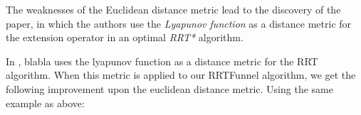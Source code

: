 The weaknesses of the Euclidean distance metric lead to the discovery of the
\cite{parkFeedbackMotionPlanning2015} paper, in which the authors use the
\textit{Lyapunov function} as a distance metric for the extension operator in an
optimal \textit{RRT*} algorithm.

In \cite{SomePaperIHave}, blabla uses the lyapunov function as a distance metric
for the RRT algorithm. When this metric is applied to our RRTFunnel algorithm,
we get the following improvement upon the euclidean distance metric. Using the
same example as above:



